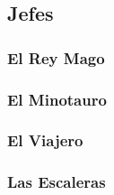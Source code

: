 \subsection{Jefes}


\subsubsection{El Rey Mago}

\subsubsection{El Minotauro}

\subsubsection{El Viajero}

\subsubsection{Las Escaleras}


    

